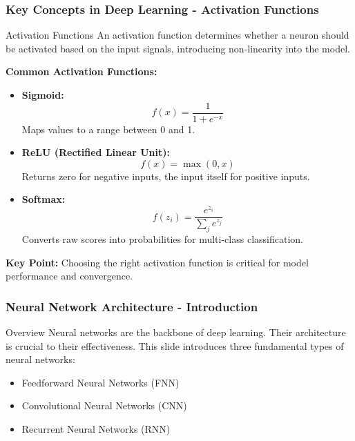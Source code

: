 \documentclass[aspectratio=169]{beamer}
\begin{document}
\begin{frame}[fragile]
    \frametitle{Key Concepts in Deep Learning - Activation Functions}
    \begin{block}{Activation Functions}
        An activation function determines whether a neuron should be activated based on the input signals, introducing non-linearity into the model.
    \end{block}

    \textbf{Common Activation Functions:}
    \begin{itemize}
        \item \textbf{Sigmoid:}
            \begin{equation}
            f(x) = \frac{1}{1 + e^{-x}}
            \end{equation}
            Maps values to a range between 0 and 1.
        
        \item \textbf{ReLU (Rectified Linear Unit):}
            \begin{equation}
            f(x) = \max(0, x)
            \end{equation}
            Returns zero for negative inputs, the input itself for positive inputs.
        
        \item \textbf{Softmax:}
            \begin{equation}
            f(z_i) = \frac{e^{z_i}}{\sum_{j} e^{z_j}}
            \end{equation}
            Converts raw scores into probabilities for multi-class classification.
    \end{itemize}

    \textbf{Key Point:} Choosing the right activation function is critical for model performance and convergence.
\end{frame}

\begin{frame}[fragile]
    \frametitle{Neural Network Architecture - Introduction}
    \begin{block}{Overview}
        Neural networks are the backbone of deep learning. Their architecture is crucial to their effectiveness. This slide introduces three fundamental types of neural networks:
    \end{block}
    \begin{itemize}
        \item Feedforward Neural Networks (FNN)
        \item Convolutional Neural Networks (CNN)
        \item Recurrent Neural Networks (RNN)
    \end{itemize}
\end{frame}
\end{document}
